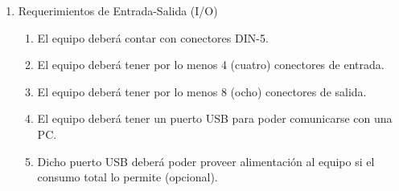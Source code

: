 \documentclass[
11pt, %
]{charter}
\begin{document}
\begin{enumerate}
	\item Requerimientos de Entrada-Salida (I/O)
	\begin{enumerate}
		\item El equipo deberá contar con conectores DIN-5.
		\item El equipo deberá tener por lo menos 4 (cuatro) conectores de entrada.
		\item El equipo deberá tener por lo menos 8 (ocho) conectores de salida.
		\item El equipo deberá tener un puerto USB para poder comunicarse con una PC.
		\item Dicho puerto USB deberá poder proveer alimentación al equipo si el consumo total lo permite (opcional).
	\end{enumerate}
	

\end{enumerate}
\end{document}
